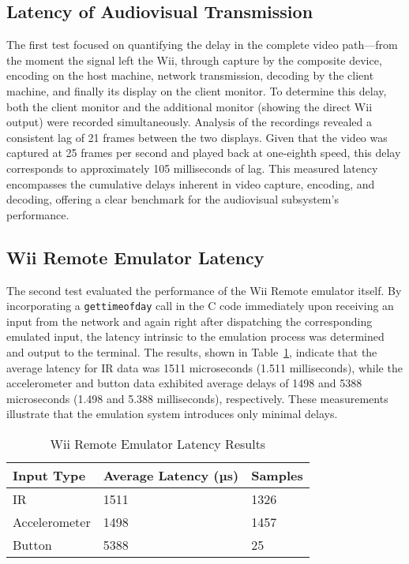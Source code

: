 \subsection{Latency of Audiovisual Transmission}

The first test focused on quantifying the delay in the complete video path—from
the moment the signal left the Wii, through capture by the composite device,
encoding on the host machine, network transmission, decoding by the client
machine, and finally its display on the client monitor. To determine this delay,
both the client monitor and the additional monitor (showing the direct Wii
output) were recorded simultaneously. Analysis of the recordings revealed a
consistent lag of 21 frames between the two displays. Given that the video was
captured at 25 frames per second and played back at one-eighth speed, this delay
corresponds to approximately 105 milliseconds of lag. This measured latency
encompasses the cumulative delays inherent in video capture, encoding, and
decoding, offering a clear benchmark for the audiovisual subsystem’s
performance.

\subsection{Wii Remote Emulator Latency}

The second test evaluated the performance of the Wii Remote emulator itself. By
incorporating a \texttt{gettimeofday} call in the C code immediately upon receiving an
input from the network and again right after dispatching the corresponding
emulated input, the latency intrinsic to the emulation process was determined and output to the terminal.
The results, shown in Table~\ref{table:emulator}, indicate that the average
latency for IR data was 1511 microseconds (1.511 milliseconds), while the
accelerometer and button data exhibited average delays of 1498 and 5388
microseconds (1.498 and 5.388 milliseconds), respectively. These measurements
illustrate that the emulation system introduces only minimal delays.


\begin{table}[!ht]
    \centering
    \begin{tabular}{|l|l|l|}
    \hline
        Input Type & Average Latency (µs) & Samples \\ \hline
        IR & 1511 & 1326 \\ \hline
        Accelerometer & 1498 & 1457 \\ \hline
        Button & 5388 & 25 \\ \hline
    \end{tabular}
    \caption{Wii Remote Emulator Latency Results}
    \label{table:emulator}
\end{table}

